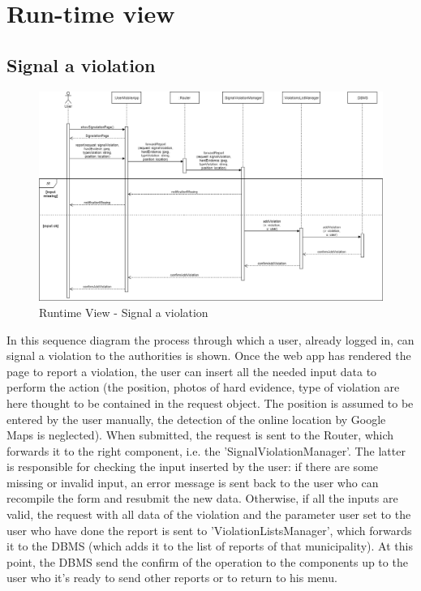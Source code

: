     \section{Run-time view}
        \subsection{Signal a violation}
        \begin{figure}[H]
            \includegraphics[scale=0.35]{dd/resources/images/RuntimeView-SignalViolation}
            \caption{Runtime View - Signal a violation}        
        \end{figure}
        In this sequence diagram the process through which a user, already logged 
        in, can signal a violation to the authorities is shown. Once the web app 
        has rendered the page to report a violation, the user can insert all the
        needed input data to perform the action (the position, photos of hard evidence, 
        type of violation are here thought to be contained in the request object. 
        The position is assumed to be entered by the user manually, the detection of 
        the online location by Google Maps is neglected). When submitted, the request 
        is sent to the Router, which forwards it to the right component, i.e. the 
        'SignalViolationManager'. The latter is responsible for checking the input 
        inserted by the user: if there are some missing or invalid input, an error 
        message is sent back to the user who can recompile the form and resubmit the 
        new data. Otherwise, if all the inputs are valid, the request with all data of 
        the violation and the parameter user set to the user who have done the report 
        is sent to 'ViolationListsManager', which forwards it to the DBMS (which adds 
        it to the list of reports of that municipality). At this point, the DBMS send 
        the confirm of the operation to the components up to the user who it's ready to 
        send other reports or to return to his menu.

